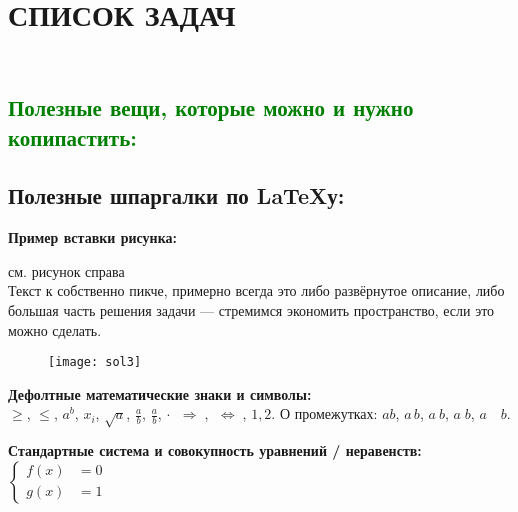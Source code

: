 \documentclass[12pt]{article}
\newcommand{\mode}[1]{
\ifstrequal{#1}{0}{\togglefalse{ifsolved}\togglefalse{needhelp}}{\ifstrequal{#1}{1}{\togglefalse{ifsolved}\toggletrue{needhelp}}{\ifstrequal{#1}{2}{\toggletrue{ifsolved}\togglefalse{needhelp}}{\toggletrue{ifsolved}\toggletrue{needhelp}}}}} %
\begin{document}
\large
\mode{7}

{\centering\section*{СПИСОК ЗАДАЧ}}

{\centering\subsection*{\smallskip\\\textcolor{green}{\textbf{Полезные вещи, которые можно и нужно копипастить:}}}}

\subsection*{\textcolor{Emerald}{\textbf{Полезные шпаргалки по LaTeXу:}}}

\textbf{Пример вставки рисунка:}

\begin{minipage}{\linewidth}
    \begin{minipage}{0.54\linewidth}
    см. рисунок справа\\
    Текст к собственно пикче, примерно всегда это либо развёрнутое описание, либо большая часть решения задачи --- стремимся экономить пространство, если это можно сделать.
    \end{minipage}
    \hspace{0.05\linewidth}
    \begin{minipage}{0.4\linewidth}
    \begin{figure}[H] \texttt{[image: sol3]} %
    \end{figure}
    \end{minipage}
\end{minipage}

\textbf{Дефолтные математические знаки и символы:}\\
$\geqslant$,
$\leqslant$,
$a^{b}$,
$x_{i}$,
$\sqrt{a}$,
$\frac{a}{b}$,
$\displaystyle \frac{a}{b}$,
$\cdot$
$\;\Rightarrow\;$,
$\;\Leftrightarrow\;$,
$1{,}2$.
О промежутках:
$a\!b$,
$a\,b$,
$a\:b$,
$a\;b$,
$a\quad b$.

\textbf{Стандартные система и совокупность уравнений / неравенств:}\\
$\left\{
\begin{aligned}
f(x) &= 0 \\
g(x) &= 1
\end{aligned}\right.$
\end{document}
